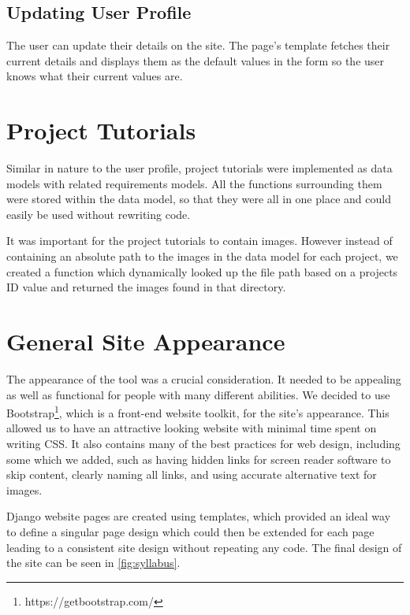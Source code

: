\documentclass{l4proj}
\begin{document}
\subsection{Updating User Profile} 
The user can update their details on the site. The page's template fetches their current details and displays them as the default values in the form so the user knows what their current values are. 

\section{Project Tutorials}
Similar in nature to the user profile, project tutorials were implemented as data models with related requirements models. All the functions surrounding them were stored within the data model, so that they were all in one place and could easily be used without rewriting code. 

It was important for the project tutorials to contain images. However instead of containing an absolute path to the images in the data model for each project, we created a function which dynamically looked up the file path based on a projects ID value and returned the images found in that directory. 

\section{General Site Appearance}
The appearance of the tool was a crucial consideration. It needed to be appealing as well as functional for people with many different abilities. We decided to use Bootstrap\footnote{https://getbootstrap.com/}, which is a front-end website toolkit, for the site's appearance. This allowed us to have an attractive looking website with minimal time spent on writing CSS. It also contains many of the best practices for web design, including some which we added, such as having hidden links for screen reader software to skip content, clearly naming all links, and using accurate alternative text for images. 

Django website pages are created using templates, which provided an ideal way to define a singular page design which could then be extended for each page leading to a consistent site design without repeating any code. The final design of the site can be seen in \ref{fig:syllabus}. 
\end{document}
